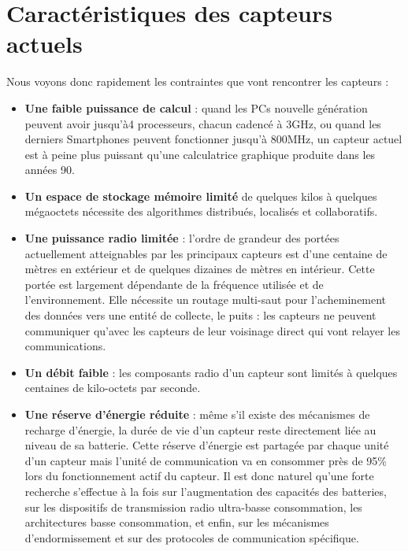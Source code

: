 \section{Caractéristiques des capteurs actuels}
Nous voyons donc rapidement les contraintes que vont rencontrer les capteurs :
\begin{itemize}

\item \textbf{Une faible puissance de calcul} : quand les PCs nouvelle génération peuvent avoir jusqu’à4 processeurs, chacun cadencé à 3GHz, ou quand les derniers Smartphones peuvent fonctionner jusqu’à 800MHz, un capteur actuel est à peine plus puissant qu’une calculatrice graphique produite dans les années 90.

\item \textbf{Un espace de stockage mémoire limité} de quelques kilos à quelques mégaoctets nécessite des algorithmes distribués, localisés et collaboratifs.

\item \textbf{Une puissance radio limitée} : l’ordre de grandeur des portées actuellement atteignables par les principaux capteurs est d’une centaine de mètres en extérieur et de quelques dizaines de mètres en intérieur. Cette portée est largement dépendante de la fréquence utilisée et de l’environnement. Elle nécessite un routage multi-saut pour l’acheminement des données vers une entité de collecte, le puits : les capteurs ne peuvent communiquer qu’avec les capteurs de leur voisinage direct qui vont relayer les communications.

\item \textbf{Un débit faible} : les composants radio d’un capteur sont limités à quelques centaines de kilo-octets par seconde.

\item \textbf{Une réserve d’énergie réduite} : même s’il existe des mécanismes de recharge d’énergie, la durée de vie d’un capteur reste directement liée au niveau de sa batterie. Cette réserve d’énergie est partagée par chaque unité d’un capteur mais l’unité de communication va en consommer près de 95\% lors du fonctionnement actif du capteur. Il est donc naturel qu’une forte recherche s’effectue à la fois sur l’augmentation des capacités des batteries, sur les dispositifs de transmission radio ultra-basse consommation, les architectures basse consommation, et enfin, sur les mécanismes d’endormissement et sur des protocoles de communication spécifique.

\end{itemize}

